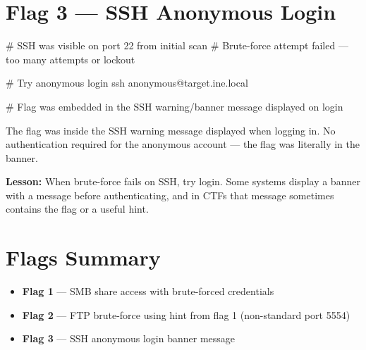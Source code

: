 \begin{checkbox}
\begin{notebox}
\section*{Flag 3 --- SSH Anonymous Login}

\begin{termbox}
# SSH was visible on port 22 from initial scan
# Brute-force attempt failed --- too many attempts or lockout

# Try anonymous login
ssh anonymous@target.ine.local

# Flag was embedded in the SSH warning/banner message displayed on login
\end{termbox}

The flag was inside the SSH warning message displayed when logging in. No
authentication required for the anonymous account --- the flag was literally
in the banner.

\begin{takebox}
\textbf{Lesson:} When brute-force fails on SSH, try  login.
Some systems display a banner with a message before authenticating, and in
CTFs that message sometimes contains the flag or a useful hint.
\end{takebox}

\section*{Flags Summary}

\begin{checkbox}
\begin{itemize}
  \item[$\checkmark$] \textbf{Flag 1} --- SMB share access with brute-forced credentials
  \item[$\checkmark$] \textbf{Flag 2} --- FTP brute-force using hint from flag 1
        (non-standard port 5554)
  \item[$\checkmark$] \textbf{Flag 3} --- SSH anonymous login banner message
\end{itemize}
\end{checkbox}

\end{notebox}
\end{checkbox}